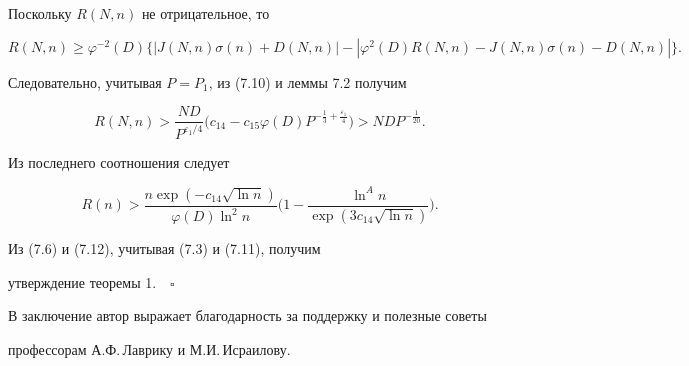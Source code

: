Поскольку $R(N,n)$ не отрицательное, то


$$


R(N,n)\ge\varphi^{-2}(D)\{|J(N,n)\sigma(n)+D(N,n)|-


|\varphi^2(D)R(N,n)-J(N,n)\sigma(n)-D(N,n)|\}.


$$         





Следовательно, учитывая $P=P_1$, из (7.10) и леммы 7.2 получим


$$


R(N,n)>\frac{ND}{P^{\varepsilon_1/4}}\big(c_{14}-c_{15}\varphi(D)


P^{-\frac13+\frac{\varepsilon_1}{4}}\big)> NDP^{-\frac{1}{20}}.


$$


Из последнего соотношения следует


\begin{equation}


R(n)>\frac{n\exp(-c_{14}\sqrt{\ln n})}{\varphi(D)\ln^2n}\bigg(


1-\frac{\ln^A n}{\exp(3c_{14}\sqrt{\ln n})}\bigg).


\end{equation}


Из (7.6) и (7.12), учитывая (7.3) и (7.11), получим


утверждение теоремы 1.$\quad\square$





В заключение автор выражает благодарность за поддержку и полезные советы


профессорам А.Ф.\,Лаврику и М.И.\,Исраилову.





